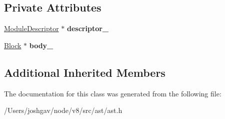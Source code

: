 \subsection*{Private Attributes}
\begin{DoxyCompactItemize}
\item 
\hyperlink{classv8_1_1internal_1_1_module_descriptor}{Module\+Descriptor} $\ast$ {\bfseries descriptor\+\_\+}\hypertarget{classv8_1_1internal_1_1_module_adc9937c4a92f68495adf629ffcc18084}{}\label{classv8_1_1internal_1_1_module_adc9937c4a92f68495adf629ffcc18084}

\item 
\hyperlink{classv8_1_1internal_1_1_block}{Block} $\ast$ {\bfseries body\+\_\+}\hypertarget{classv8_1_1internal_1_1_module_ae754137ece1be00e54096740cbcb5e05}{}\label{classv8_1_1internal_1_1_module_ae754137ece1be00e54096740cbcb5e05}

\end{DoxyCompactItemize}
\subsection*{Additional Inherited Members}


The documentation for this class was generated from the following file\+:\begin{DoxyCompactItemize}
\item 
/\+Users/joshgav/node/v8/src/ast/ast.\+h\end{DoxyCompactItemize}
